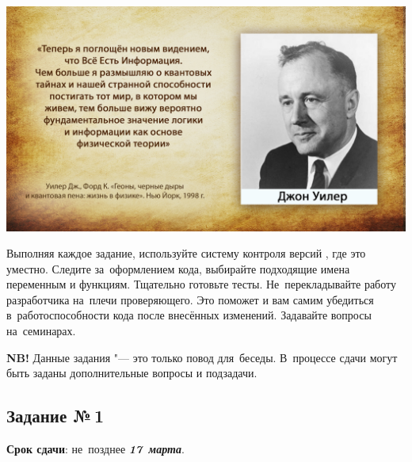 \documentclass[a4paper,11pt,landscape,notitlepage,oneside,openany,final]{memoir}
\begin{document}



\newcommand*{\Hi}{\rule{0pt}{13pt}}
\newcommand*{\darkrow}{\rowcolor{black!5}}

\newcommand{\tabheaderitem}[2]{\multicolumn{1}{#1}{\multirow{2}{*}{#2}}}

\newcommand*{\task}[1]{\makebox[3.0cm]{задание №\,#1\Hi}}

\newcommand*{\groupmark}[1]{\textit{группа \textbf{#1}}}
\newcommand*{\groupsection}[1]{\AbstractSection{Группа №\,\textbf{#1}}}

\newcommand*{\pd}{\text{\(+\)\hspace{-3pt}.}}
\newcommand*{\md}{\text{\(-\)\hspace{-3pt}.}}

\newcommand*{\deadline}[1]{\textit{\bfseries\color{DarkRed!60}#1}}
\newcommand*{\notabene}[1]{\textit{\bfseries\color{DarkRed!70}#1}}


\clearpage
\noindent
\includegraphics[width=\textwidth]{images/Джон-Уилер_RU.jpg}


\clearpage
\renewcommand{\rightmark}{Задания}
Выполняя каждое задание, используйте систему контроля версий \git{}, где это уместно. Следите за~оформлением кода, выбирайте подходящие имена переменным и функциям. Тщательно готовьте тесты. Не~перекладывайте работу разработчика на~плечи проверяющего. Это поможет и вам самим убедиться в~работоспособности кода после внесённых изменений. Задавайте вопросы на~семинарах.

\textbf{NB!} Данные задания "--- это только повод для~беседы. В~процессе сдачи могут быть заданы дополнительные вопросы и подзадачи.



\subsection{Задание №\,1}
\textbf{Срок сдачи}: не~позднее \deadline{17~марта}.
\end{document}
